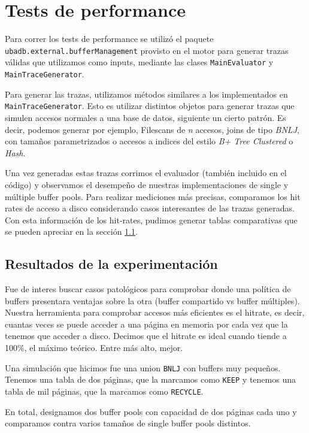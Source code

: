 \section{Tests de performance}
Para correr los tests de performance se utiliz\'o el paquete \texttt{ubadb.external.bufferManagement} provisto en el
motor para generar trazas v\'alidas que utilizamos como inputs, mediante las clases \texttt{MainEvaluator} y \texttt{MainTraceGenerator}.

Para generar las trazas, utilizamos m\'etodos similares a los implementados en \texttt{MainTraceGenerator}. Esto es
utilizar distintos objetos para generar trazas que simulen accesos normales a una base de datos, siguiente un cierto
patr\'on. Es decir, podemos generar por ejemplo, Filescans de \textit{n} accesos, joins de tipo \textit{BNLJ}, con
tama\~nos parametrizados o accesos a indices del estilo \textit{B+ Tree Clustered} o \textit{Hash}.

Una vez generadas estas trazas corrimos el evaluador (tambi\'en incluido en el c\'odigo) y observamos el
desempe\~no de nuestras implementaciones de single y m\'ultiple buffer pools. Para realizar mediciones m\'as
precisas, comparamos los hit rates de acceso a disco considerando casos interesantes de las trazas generadas.
Con esta informaci\'on de los hit-rates, pudimos generar tablas comparativas que se pueden apreciar en la secci\'on \ref{secTablas}.


\subsection{Resultados de la experimentaci\'on}\label{secTablas}

Fue de interes buscar casos patol\'ogicos para comprobar donde una pol\'itica de
buffers presentara ventajas sobre la otra (buffer compartido vs buffer m\'ultiples).
Nuestra herramienta para comprobar accesos m\'as eficientes es el hitrate,
es decir, cuantas veces se puede acceder a una p\'agina en memoria por cada vez que
la tenemos que acceder a disco. Decimos que el hitrate es ideal cuando
tiende a 100\%, el m\'aximo te\'orico. Entre m\'as alto, mejor.

Una simulaci\'on que hicimos fue una union \texttt{BNLJ} con buffers muy peque\~nos.
Tenemos una tabla de dos p\'aginas, que la marcamos como \texttt{KEEP} y tenemos
una tabla de mil p\'aginas, que la marcamos como \texttt{RECYCLE}.

En total, designamos dos buffer pools con capacidad de dos p\'aginas cada uno
y comparamos contra varios tama\~nos de single buffer pools distintos.

